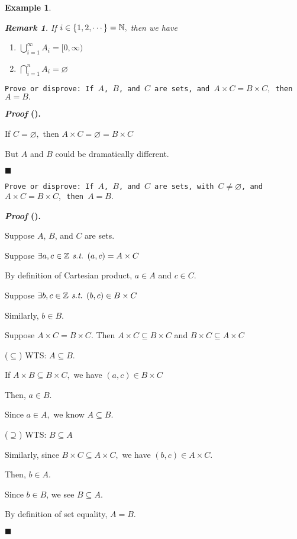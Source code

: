 \documentclass[12pt,a4paper]{article}
\newtheorem{eg}{Example}[subsection]
\newcounter{nprf}[subsection]
\newtheorem*{rmk}{\indent Remark}
\newenvironment*{prf}{\par\indent\textbf{\textit{Proof} (\stepcounter{nprf}\thenprf). }\par }{\par\hfill $\blacksquare$\par}
\def\Z{{\mathbb{Z}}}
\def\N{{\mathbb{N}}}
\def\emptyset{\varnothing}
\def\st{\emph{ s.t. }}
\begin{document}
\begin{eg}
\begin{enumerate}
\begin{enumerate}
		\end{enumerate}
		\begin{rmk}
			If $i\in\qty{1,2,\cdots}=\N,$ then we have
			\begin{enumerate}
			\item $\displaystyle\bigcup_{i=1}^\infty A_i=[0,\infty)$
			\item $\displaystyle\bigcap_{i=1}^n A_i=\emptyset$
			\end{enumerate}
		\end{rmk}
	\end{enumerate}
\end{eg}
\begin{framed}
\noindent\texttt{Prove or disprove: If $A$, $B$, and $C$ are sets, and $A\times C=B\times C,$ then $A=B.$}
\begin{prf}
	If $C=\emptyset,$ then $A\times C=\emptyset=B\times C$\par But $A$ and $B$ could be dramatically different.
\end{prf}
\end{framed}
\begin{framed}
\noindent\texttt{Prove or disprove: If $A$, $B$, and $C$ are sets, with $C\neq\emptyset$, and $A\times C=B\times C,$ then $A=B.$}
\begin{prf}
	Suppose $A$, $B$, and $C$ are sets.\par Suppose $\exists a,c\in\Z\st(a,c)=A\times C$\par By definition of Cartesian product, $a\in A$ and $c\in C.$\par Suppose $\exists b,c\in\Z\st (b,c)\in B\times C$\par Similarly, $b\in B.$\par Suppose $A\times C=B\times C.$ Then $A\times C\subseteq B\times C$ and $B\times C\subseteq A\times C$\par($\subseteq$) WTS: $A\subseteq B$.\par\hspace{5mm}If $A\times B\subseteq B\times C,$ we have $(a,c)\in B\times C$\par\hspace{5mm}Then, $a\in B.$\par\hspace{5mm}Since $a\in A,$ we know $A\subseteq B.$\par($\supseteq$) WTS: $B\subseteq A$\par\hspace{5mm}Similarly, since $B\times C\subseteq A\times C,$ we have $(b,c)\in A\times C.$\par\hspace{5mm}Then, $b\in A.$\par\hspace{5mm}Since $b\in B$, we see $B\subseteq A.$\par\hspace{5mm}By definition of set equality, $A=B.$
\end{prf}
\end{framed}
\end{document}
